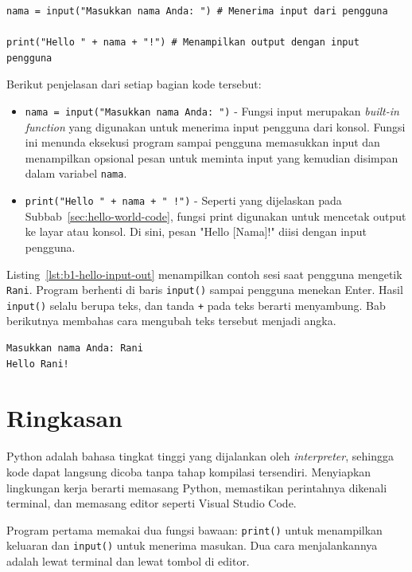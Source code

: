 \begin{lstlisting}[style=PythonStyle, caption={Kode Python: hello_with_input.py}, label={lst:b1-hello-with-input}]
nama = input("Masukkan nama Anda: ") # Menerima input dari pengguna

print("Hello " + nama + "!") # Menampilkan output dengan input pengguna
\end{lstlisting}

Berikut penjelasan dari setiap bagian kode tersebut:

\begin{itemize}
\item \texttt{nama = input("Masukkan nama Anda: ")} - Fungsi input merupakan \textit{built-in function} yang digunakan untuk menerima input pengguna dari konsol. Fungsi ini menunda eksekusi program sampai pengguna memasukkan input dan menampilkan opsional pesan untuk meminta input yang kemudian disimpan dalam variabel \texttt{nama}.
\item \texttt{print("Hello " + nama + " !")} - Seperti yang dijelaskan pada Subbab~\ref{sec:hello-world-code}, fungsi print digunakan untuk mencetak output ke layar atau konsol. Di sini, pesan "Hello [Nama]!" diisi dengan input pengguna.
\end{itemize}


Listing~\ref{lst:b1-hello-input-out} menampilkan contoh sesi saat pengguna mengetik \texttt{Rani}. Program berhenti di baris \texttt{input()} sampai pengguna menekan Enter. Hasil \texttt{input()} selalu berupa teks, dan tanda \texttt{+} pada teks berarti menyambung. Bab berikutnya membahas cara mengubah teks tersebut menjadi angka.

\begin{lstlisting}[language=bash, caption={Contoh sesi hello_with_input.py}, label={lst:b1-hello-input-out}]
Masukkan nama Anda: Rani
Hello Rani!
\end{lstlisting}

\section{Ringkasan}
Python adalah bahasa tingkat tinggi yang dijalankan oleh \textit{interpreter}, sehingga kode dapat langsung dicoba tanpa tahap kompilasi tersendiri. Menyiapkan lingkungan kerja berarti memasang Python, memastikan perintahnya dikenali terminal, dan memasang editor seperti Visual Studio Code.

Program pertama memakai dua fungsi bawaan: \texttt{print()} untuk menampilkan keluaran dan \texttt{input()} untuk menerima masukan. Dua cara menjalankannya adalah lewat terminal dan lewat tombol di editor.

